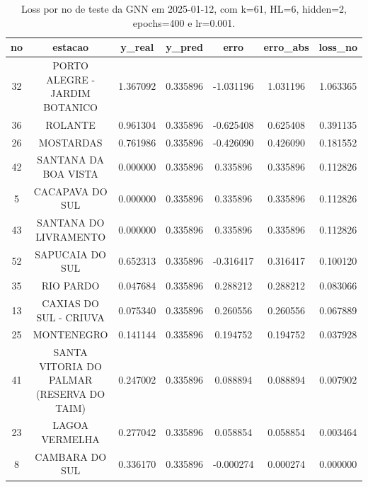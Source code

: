 \begin{table}[h]
\centering
\caption{Loss por no de teste da GNN em 2025-01-12, com k=61, HL=6, hidden=2, epochs=400 e lr=0.001.}
\label{tab:gnn_loss_k61_hl6_h2_e400_d20250112}
\begin{tabular}{ccccccc}
\toprule
no & estacao & y\_real & y\_pred & erro & erro\_abs & loss\_no \\
\midrule
32 & PORTO ALEGRE - JARDIM BOTANICO & 1.367092 & 0.335896 & -1.031196 & 1.031196 & 1.063365 \\
36 & ROLANTE & 0.961304 & 0.335896 & -0.625408 & 0.625408 & 0.391135 \\
26 & MOSTARDAS & 0.761986 & 0.335896 & -0.426090 & 0.426090 & 0.181552 \\
42 & SANTANA DA BOA VISTA & 0.000000 & 0.335896 & 0.335896 & 0.335896 & 0.112826 \\
5 & CACAPAVA DO SUL & 0.000000 & 0.335896 & 0.335896 & 0.335896 & 0.112826 \\
43 & SANTANA DO LIVRAMENTO & 0.000000 & 0.335896 & 0.335896 & 0.335896 & 0.112826 \\
52 & SAPUCAIA DO SUL & 0.652313 & 0.335896 & -0.316417 & 0.316417 & 0.100120 \\
35 & RIO PARDO & 0.047684 & 0.335896 & 0.288212 & 0.288212 & 0.083066 \\
13 & CAXIAS DO SUL - CRIUVA & 0.075340 & 0.335896 & 0.260556 & 0.260556 & 0.067889 \\
25 & MONTENEGRO & 0.141144 & 0.335896 & 0.194752 & 0.194752 & 0.037928 \\
41 & SANTA VITORIA DO PALMAR (RESERVA DO TAIM) & 0.247002 & 0.335896 & 0.088894 & 0.088894 & 0.007902 \\
23 & LAGOA VERMELHA & 0.277042 & 0.335896 & 0.058854 & 0.058854 & 0.003464 \\
8 & CAMBARA DO SUL & 0.336170 & 0.335896 & -0.000274 & 0.000274 & 0.000000 \\
\bottomrule
\end{tabular}
\end{table}
